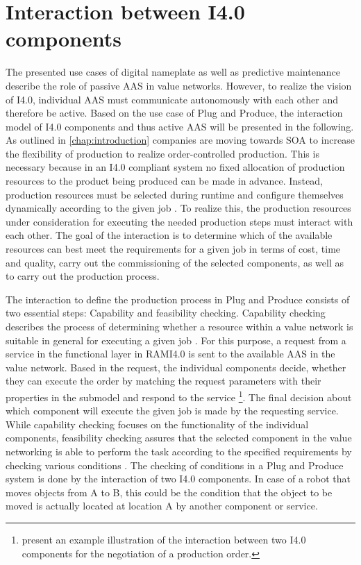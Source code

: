 \section{Interaction between I4.0 components} \label{sec:interaction-i4.0-comp}
The presented use cases of digital nameplate as well as predictive maintenance describe the role of passive \ac{AAS} in value networks. However, to realize the vision of \ac{I4.0}, individual \ac{AAS} must communicate autonomously with each other and therefore be active. Based on the use case of Plug and Produce, the interaction model of \ac{I4.0} components and thus active \ac{AAS} will be presented in the following. As outlined in \ref{chap:introduction} companies are moving towards \ac{SOA} to increase the flexibility of production to realize order-controlled production. This is necessary because in an \ac{I4.0} compliant system no fixed allocation of production resources to the product being produced can be made in advance. Instead, production resources must be selected during runtime and configure themselves dynamically according to the given job \cite[p. 6]{Bock2016Weiterentwicklung4.0-Komponenten}. To realize this, the production resources under consideration for executing the needed production steps must interact with each other. The goal of the interaction is to determine which of the available resources can best meet the requirements for a given job in terms of cost, time and quality,  carry out the commissioning of the selected components, as well as to carry out the production process. 

The interaction to define the production process in Plug and Produce consists of two essential steps: Capability and feasibility checking. Capability checking describes the process of determining whether a resource within a value network is suitable in general for executing a given job \cite[p. 6]{Bayha2020DescribingComponents}. For this purpose, a request from a service in the functional layer in \ac{RAMI4.0} is sent to the available \ac{AAS} in the value network. Based in the request, the individual components decide, whether they can execute the order by matching the request parameters with their properties in the submodel and respond to the service \cite[p. 20]{Bock2016Weiterentwicklung4.0-Komponenten} \footnote{\citet[p. 22]{Bock2016Weiterentwicklung4.0-Komponenten} present an example illustration of the interaction between two \ac{I4.0} components for the negotiation of a production order.}. The final decision about which component will execute the given job is made by the requesting service. While capability checking focuses on the functionality of the individual components, feasibility checking assures that the selected component in the value networking is able to perform the task according to the specified requirements by checking various conditions \cite[p. 6]{Bayha2020DescribingComponents} \cite[p. 15]{Bock2016Weiterentwicklung4.0-Komponenten}. The checking of conditions in a Plug and Produce system is done by the interaction of two \ac{I4.0} components. In case of a robot that moves objects from A to B, this could be the condition that the object to be moved is actually located at location A by another component or service.

